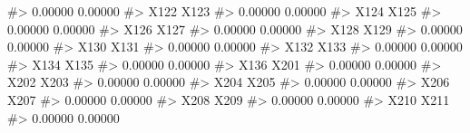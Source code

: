 \documentclass[
  letterpaper,
]{krantz}
\makeatletter
\newenvironment{Shaded}{\begin{snugshade}}{\end{snugshade}}
\newcommand{\CommentTok}[1]{\textcolor[rgb]{0.37,0.37,0.37}{#1}}
\newenvironment{kframe}{%
\medskip{}
\setlength{\fboxsep}{.8em}
 \def\at@end@of@kframe{}%
 \ifinner\ifhmode%
  \def\at@end@of@kframe{\end{minipage}}%
  \begin{minipage}{\columnwidth}%
 \fi\fi%
 \def\FrameCommand##1{\hskip\@totalleftmargin \hskip-\fboxsep
 \colorbox{shadecolor}{##1}\hskip-\fboxsep
     \hskip-\linewidth \hskip-\@totalleftmargin \hskip\columnwidth}%
 \MakeFramed {\advance\hsize-\width
   \@totalleftmargin\z@ \linewidth\hsize
   \@setminipage}}%
 {\par\unskip\endMakeFramed%
 \at@end@of@kframe}
\renewenvironment{Shaded}{\begin{kframe}}{\end{kframe}}
\makeatother
\begin{document}
\begin{Shaded}
\begin{Highlighting}[]
\CommentTok{\#\textgreater{}                          0.00000                          0.00000 }
\CommentTok{\#\textgreater{}                             X122                             X123 }
\CommentTok{\#\textgreater{}                          0.00000                          0.00000 }
\CommentTok{\#\textgreater{}                             X124                             X125 }
\CommentTok{\#\textgreater{}                          0.00000                          0.00000 }
\CommentTok{\#\textgreater{}                             X126                             X127 }
\CommentTok{\#\textgreater{}                          0.00000                          0.00000 }
\CommentTok{\#\textgreater{}                             X128                             X129 }
\CommentTok{\#\textgreater{}                          0.00000                          0.00000 }
\CommentTok{\#\textgreater{}                             X130                             X131 }
\CommentTok{\#\textgreater{}                          0.00000                          0.00000 }
\CommentTok{\#\textgreater{}                             X132                             X133 }
\CommentTok{\#\textgreater{}                          0.00000                          0.00000 }
\CommentTok{\#\textgreater{}                             X134                             X135 }
\CommentTok{\#\textgreater{}                          0.00000                          0.00000 }
\CommentTok{\#\textgreater{}                             X136                             X201 }
\CommentTok{\#\textgreater{}                          0.00000                          0.00000 }
\CommentTok{\#\textgreater{}                             X202                             X203 }
\CommentTok{\#\textgreater{}                          0.00000                          0.00000 }
\CommentTok{\#\textgreater{}                             X204                             X205 }
\CommentTok{\#\textgreater{}                          0.00000                          0.00000 }
\CommentTok{\#\textgreater{}                             X206                             X207 }
\CommentTok{\#\textgreater{}                          0.00000                          0.00000 }
\CommentTok{\#\textgreater{}                             X208                             X209 }
\CommentTok{\#\textgreater{}                          0.00000                          0.00000 }
\CommentTok{\#\textgreater{}                             X210                             X211 }
\CommentTok{\#\textgreater{}                          0.00000                          0.00000 }

\end{Highlighting}
\end{Shaded}
\end{document}
